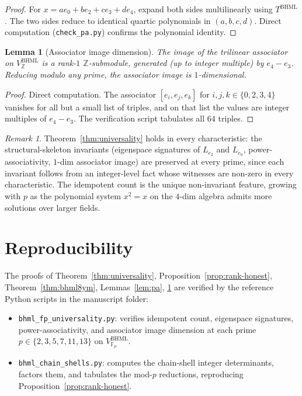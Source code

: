 \documentclass[11pt,reqno]{amsart}
\theoremstyle{plain}
\newtheorem{lemma}[theorem]{Lemma}
\theoremstyle{definition}
\theoremstyle{remark}
\newtheorem*{remark}{Remark}
\newcommand{\Z}{\mathbb{Z}}
\newcommand{\F}{\mathbb{F}}
\newcommand{\BHML}{\mathrm{BHML}}
\begin{document}
\begin{proof}
For $x = a e_{0} + b e_{2} + c e_{3} + d e_{4}$, expand both sides
multilinearly using $T^{\BHML}$. The two sides reduce to identical
quartic polynomials in $(a, b, c, d)$. Direct computation
(\texttt{check\_pa.py}) confirms the polynomial identity.
\end{proof}

\begin{lemma}[Associator image dimension]
\label{lem:assoc-dim}
The image of the trilinear associator on $V^{\BHML}_{\Z}$ is a
rank-$1$ $\Z$-submodule, generated (up to integer multiple) by
$e_{4} - e_{3}$. Reducing modulo any prime, the associator image is
$1$-dimensional.
\end{lemma}

\begin{proof}
Direct computation. The associator $[e_{i}, e_{j}, e_{k}]$ for
$i, j, k \in \{0, 2, 3, 4\}$ vanishes for all but a small list of
triples, and on that list the values are integer multiples of
$e_{4} - e_{3}$. The verification script tabulates all $64$ triples.
\end{proof}

\begin{remark}
Theorem~\ref{thm:universality} holds in every characteristic: the
structural-skeleton invariants (eigenspace signatures of $L_{e_{2}}$
and $L_{e_{0}}$, power-associativity, $1$-dim associator image) are
preserved at every prime, since each invariant follows from an
integer-level fact whose witnesses are non-zero in every
characteristic. The idempotent count is the unique non-invariant
feature, growing with $p$ as the polynomial system $x^{2} = x$ on
the $4$-dim algebra admits more solutions over larger fields.
\end{remark}

\section{Reproducibility}
\label{sec:repro}

The proofs of Theorem~\ref{thm:universality},
Proposition~\ref{prop:rank-honest}, Theorem~\ref{thm:bhml8ym},
Lemmas~\ref{lem:pa}, \ref{lem:assoc-dim} are verified by the
reference Python scripts in the manuscript folder:

\begin{itemize}
\item \texttt{bhml\_fp\_universality.py}: verifies idempotent count,
eigenspace signatures, power-associativity, and associator image
dimension at each prime $p \in \{2, 3, 5, 7, 11, 13\}$ on
$V^{\BHML}_{\F_{p}}$.
\item \texttt{bhml\_chain\_shells.py}: computes the chain-shell
integer determinants, factors them, and tabulates the mod-$p$
reductions, reproducing Proposition~\ref{prop:rank-honest}.
\end{itemize}
\end{document}
